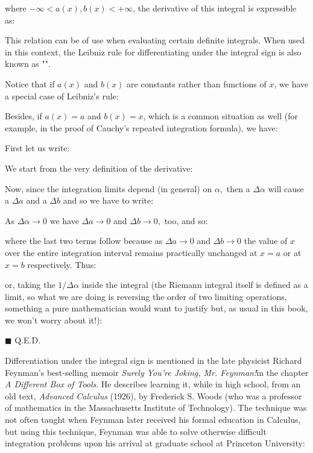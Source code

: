 	where $-\infty <a(x),b(x)<+\infty$, the derivative of this integral is expressible as:
	
	This relation can be of use when evaluating certain definite integrals. When used in this context, the Leibniz rule for differentiating under the integral sign is also known as "".
	
	Notice that if $a(x)$ and $b(x)$ are constants rather than functions of $x$, we have a special case of Leibniz's rule:
	
	Besides, if $a(x)=a$ and $b(x)=x$, which is a common situation as well (for example, in the proof of Cauchy's repeated integration formula), we have:
	
	\begin{dem}
	First let us write:
	
	We start from the very definition of the derivative:
	
	Now, since the integration limits depend (in general) on $\alpha,$ then a $\Delta \alpha$ will cause a $\Delta a$ and a $\Delta b$ and so we have to write:
	
	As $\Delta \alpha \rightarrow 0$ we have $\Delta a \rightarrow 0$ and $\Delta b \rightarrow 0,$ too, and so:
	
	where the last two terms follow because as $\Delta a \rightarrow 0$ and $\Delta b \rightarrow 0$ the value of $x$ over the entire integration interval remains practically unchanged at $x=a$ or at $x=b$ respectively. Thus:
	
	or, taking the $1/\Delta \alpha$ inside the integral (the Riemann integral itself is defined as a limit, so what we are doing is reversing the order of two limiting operations, something a pure mathematician would want to justify but, as usual in this book, we won't worry about it!):
	
	\begin{flushright}
		$\blacksquare$  Q.E.D.
	\end{flushright}
	\end{dem}
	Differentiation under the integral sign is mentioned in the late physicist Richard Feynman's best-selling memoir \textit{Surely You're Joking, Mr. Feynman!}in the chapter \textit{A Different Box of Tools}. He describes learning it, while in high school, from an old text, \textit{Advanced Calculus} (1926), by Frederick S. Woods (who was a professor of mathematics in the Massachusetts Institute of Technology). The technique was not often taught when Feynman later received his formal education in Calculus, but using this technique, Feynman was able to solve otherwise difficult integration problems upon his arrival at graduate school at Princeton University:
	
